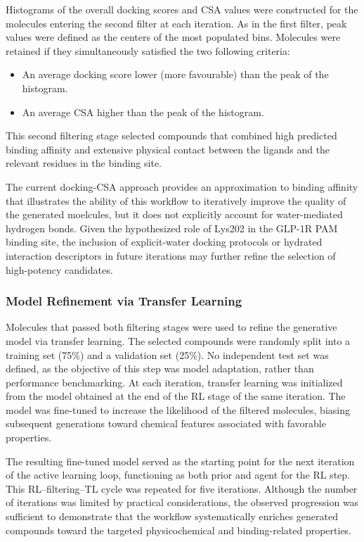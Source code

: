 Histograms of the overall docking scores and CSA values were constructed for the molecules entering the second filter at each iteration. As in the first filter, peak values were defined as the centers of the most populated bins. Molecules were retained if they simultaneously satisfied the two following criteria:
\begin{itemize}
\item An average docking score lower (more favourable) than the peak of the histogram.
\item An average CSA higher than the peak of the histogram.
\end{itemize}
This second filtering stage selected compounds that combined high predicted binding affinity and extensive physical contact between the ligands and the relevant residues in the binding site. 

The current docking-CSA approach provides an approximation to binding affinity that illustrates the ability of this workflow to iteratively improve the quality of the generated moelcules, but it does not explicitly account for water-mediated hydrogen bonds. Given the hypothesized role of Lys202 in the GLP-1R PAM binding site, the inclusion of explicit-water docking protocols or hydrated interaction descriptors in future iterations may further refine the selection of high-potency candidates.

\subsubsection{Model Refinement via Transfer Learning}
Molecules that passed both filtering stages were used to refine the generative model via transfer learning. The selected compounds were randomly split into a training set (75\%) and a validation set (25\%). No independent test set was defined, as the objective of this step was model adaptation, rather than performance benchmarking. At each iteration, transfer learning was initialized from the model obtained at the end of the RL stage of the same iteration. The model was fine-tuned to increase the likelihood of the filtered molecules, biasing subsequent generations toward chemical features associated with favorable properties.

The resulting fine-tuned model served as the starting point for the next iteration of the active learning loop, functioning as both prior and agent for the RL step. This RL–filtering–TL cycle was repeated for five iterations. Although the number of iterations was limited by practical considerations, the observed progression was sufficient to demonstrate that the workflow systematically enriches generated compounds toward the targeted physicochemical and binding-related properties.

